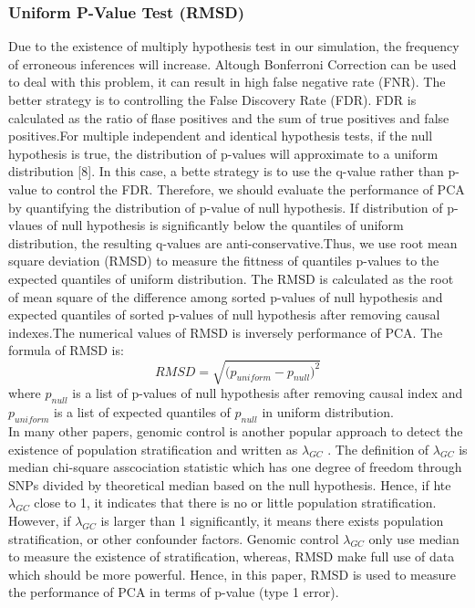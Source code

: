 \documentclass[12pt]{article}
\begin{document}
\subsubsection{Uniform P-Value Test (RMSD)}
Due to the existence of multiply hypothesis test in our simulation, the frequency of erroneous inferences will increase. Altough Bonferroni Correction can be used to deal with this problem, it can result in high false negative rate (FNR). The better strategy is to controlling the False Discovery Rate (FDR). FDR is calculated as the ratio of flase positives and the sum of true positives and false positives.For multiple independent and identical hypothesis tests, if the null hypothesis is true, the distribution of p-values will approximate to a uniform distribution [8]. In this case, a bette strategy is to use the q-value rather than p-value to control the FDR. Therefore, we should evaluate the performance of PCA by quantifying the distribution of p-value of null hypothesis. If distribution of p-vlaues of null hypothesis is significantly below the quantiles of uniform distribution, the resulting q-values are anti-conservative.Thus, we use root mean square deviation (RMSD) to measure the fittness of quantiles p-values to the expected quantiles of uniform distribution. The RMSD is calculated as the root of mean square of the difference among sorted p-values of null hypothesis and expected quantiles of sorted p-values of null hypothesis after removing causal indexes.The numerical values of RMSD is inversely  performance of PCA. The formula of RMSD is:
$$RMSD=\sqrt{{(p_{uniform}-p_{null}})^2}$$
where $p_{null}$ is a list of p-values of null hypothesis after removing causal index and $p_{uniform}$ is a list of expected quantiles of $p_{null}$ in uniform distribution. \\

In many other papers, genomic control is another popular approach to detect the existence of population stratification and written as $\lambda_{GC}$ . The definition of $\lambda_{GC}$ is median chi-square asscociation statistic which has one degree of freedom through SNPs divided by theoretical median based on the null hypothesis. Hence, if hte $\lambda_{GC}$ close to 1, it indicates that there is no or little population stratification. However, if $\lambda_{GC}$ is larger than 1 significantly, it means there exists population stratification, or other confounder factors. Genomic control $\lambda_{GC}$ only use median to measure the existence of stratification, whereas, RMSD make full use of data which should be more powerful. Hence, in this paper, RMSD is used to measure the performance of PCA in terms of p-value (type 1 error).
\end{document}
